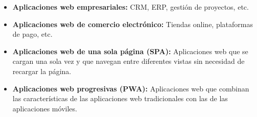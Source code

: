 \begin{itemize}
      \begin{itemize}

    \item \textbf{Aplicaciones web empresariales:} CRM, ERP, gestión de proyectos, etc.

    \item \textbf{Aplicaciones web de comercio electrónico:} Tiendas online, plataformas de pago, etc.

    \item \textbf{Aplicaciones web de una sola página (SPA):} Aplicaciones web que se cargan una sola vez y que navegan entre diferentes vistas sin necesidad de recargar la página.

    \item \textbf{Aplicaciones web progresivas (PWA):} Aplicaciones web que combinan las características de las aplicaciones web tradicionales con las de las aplicaciones móviles.

    \end{itemize}
\end{itemize}